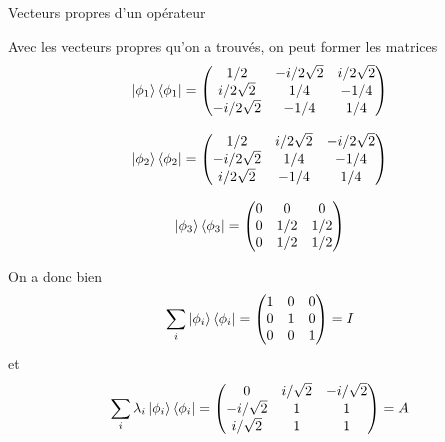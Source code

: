 \documentclass[12pt,solution=false]{uqtrassignment}
\begin{document}
\begin{problem}{Vecteurs propres d'un opérateur}
\begin{solution}
\subproblem

Avec les vecteurs propres qu'on a trouvés,
  on peut former les matrices
\begin{align}
  \ket{\phi_1}\bra{\phi_1}
  =
  \begin{pmatrix}
     1/2   & -i/2\sqrt{2}  & i/2\sqrt{2}\\
     i/2\sqrt{2}   & 1/4  & -1/4\\
     -i/2\sqrt{2}  & -1/4  & 1/4 \\
  \end{pmatrix}
\end{align}

\begin{align}
  \ket{\phi_2}\bra{\phi_2}
  =
  \begin{pmatrix}
     1/2   & i/2\sqrt{2}  & -i/2\sqrt{2}\\
     -i/2\sqrt{2}   & 1/4  & -1/4\\
     i/2\sqrt{2}  & -1/4  & 1/4
  \end{pmatrix}
\end{align}

\begin{align}
  \ket{\phi_3}\bra{\phi_3}
  =
  \begin{pmatrix}
      0 & 0   & 0\\
      0 & 1/2 & 1/2\\
      0 & 1/2 & 1/2
  \end{pmatrix}
\end{align}

On a donc bien
\begin{align}
  \sum_i \ket{\phi_i} \bra{\phi_i}
  =
  \begin{pmatrix}
      1 & 0   & 0\\
      0 & 1   & 0\\
      0 & 0   & 1
  \end{pmatrix}
  =
  I
\end{align}
et
\begin{align}
  \sum_i \lambda_i \ket{\phi_i} \bra{\phi_i}
  =
  \begin{pmatrix}
    0   &  i / \sqrt{2}  & -i/\sqrt{2}\\
    -i/\sqrt{2}   &   1  & 1\\
     i/\sqrt{2}   &   1  & 1\\
  \end{pmatrix}
  =
  A
\end{align}


\end{solution}

\end{problem}
\end{document}
